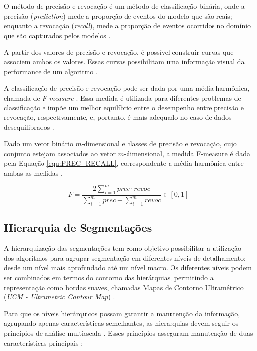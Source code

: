 \begin{document}
O método de precisão e revocação é um método de classificação binária, onde a precisão (\textit{prediction}) mede a proporção de eventos do modelo que são reais; enquanto a revocação (\textit{recall}), mede a proporção de eventos ocorridos no domínio que são capturados pelos modelos \cite{PREC_RECALL_REGR}. 

A partir dos valores de precisão e revocação, é possível construir curvas que associem ambos os valores. Essas curvas possibilitam uma informação visual da performance de um algoritmo \cite{PRECISION_RECALL}. 

A classificação de precisão e revocação pode ser dada por uma média harmônica, chamada de \textit{F-measure} \cite{F_MEASURE}. Essa medida é utilizada para diferentes problemas de classificação e impõe um melhor equilíbrio entre o desempenho entre precisão e revocação, respectivamente, e, portanto, é mais adequado no caso de dados desequilibrados \cite{F_MEASURE}. 

Dado um vetor binário $m$-dimensional e classes de precisão e revocação, cujo conjunto estejam associados ao vetor $m$-dimensional, a medida F-measure é dada pela Equação \ref{equ:PREC_RECALL}, correspondente a média harmônica entre ambas as medidas \cite{F_MEASURE}.

\begin{equation}
 F=\frac{ 2 \sum\limits_{i=1}^m {prec \cdot revoc}}{ \sum\limits_{i=1}^m {prec} + \sum\limits_{i=1}^m {revoc}}  \in [0,1]
 \label{equ:PREC_RECALL}
\end{equation}


\subsection{Hierarquia de Segmentações} \label{ssec:hierarq_segmentacao}

A hierarquização das segmentações tem como objetivo possibilitar a utilização dos algoritmos para agrupar segmentação em diferentes níveis de detalhamento: desde um nível mais aprofundado até um nível macro. Os diferentes níveis podem ser combinados em termos do contorno das hierárquias, permitindo a representação como bordas suaves, chamadas Mapas de Contorno Ultramétrico (\textit{UCM - Ultrametric Contour Map}) \cite{ULTRAMETRIC}.

Para que os níveis hierárquicos possam garantir a manutenção da informação, agrupando apenas características semelhantes, as hierarquias devem seguir os princípios de análise multiescala \cite{SILVIO_ZENILTON}. Esses princípios asseguram manutenção de duas características principais \cite{SILVIO_ZENILTON}:
\end{document}
